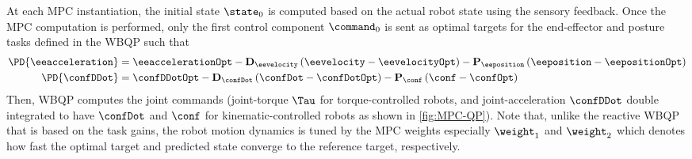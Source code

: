 At each MPC instantiation, the initial state $\state_{0}$ is computed based on the actual robot state using the sensory feedback. Once the MPC computation is performed, only the first control component  $\command_0$ is sent as optimal targets for the end-effector and posture tasks defined in the WBQP such that 
\begin{align}
	\label{eq:optimal Cartesian target for QP}\PD{\eeacceleration} &=\eeaccelerationOpt -\mathbf{D}_{\eevelocity}\left(\eevelocity - \eevelocityOpt\right) - \mathbf{P}_{\eeposition}\left(\eeposition-\eepositionOpt\right) \\
	\label{eq:optimal posture target for QP}\PD{\confDDot}&= \confDDotOpt-\mathbf{D}_{\confDot}\left(\confDot-\confDotOpt\right) - \mathbf{P}_{\conf}\left(\conf-\confOpt\right)
\end{align} 
 Then, WBQP computes the joint commands (joint-torque $\Tau$ for torque-controlled robots, and joint-acceleration $\confDDot$ double integrated to have $\confDot$ and $\conf$ for kinematic-controlled robots as shown in \cref{fig:MPC-QP}). Note that, unlike the reactive WBQP that is based on the task gains, the robot motion dynamics is tuned by the MPC weights especially $\weight_{1}$ and $\weight_{2}$ which denotes how fast the optimal target and predicted state converge to the reference target, respectively.

